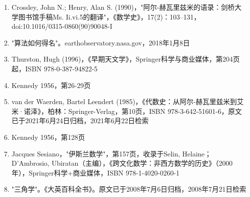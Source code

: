 \begin{enumerate}
\item Crossley, John N.; Henry, Alan S. (1990)，"阿尔-赫瓦里兹米的语录：剑桥大学图书馆手稿Ms. Ii.vi.5的翻译"，《数学史》，17(2)：103–131，doi:10.1016/0315-0860(90)90048-I  
\item "算法如何得名"。earthobservatory.nasa.gov，2018年1月8日  
\item Thurston, Hugh (1996)，《早期天文学》，Springer科学与商业媒体，第204页起，ISBN 978-0-387-94822-5  
\item Kennedy 1956，第26-29页  
\item van der Waerden, Bartel Leendert (1985)，《代数史：从阿尔-赫瓦里兹米到艾米·诺泽》，柏林：Springer-Verlag，第10页，ISBN 978-3-642-51601-6，原文已于2021年6月24日归档，2021年6月22日检索  
\item Kennedy 1956，第128页  
\item Jacques Sesiano，"伊斯兰数学"，第157页，收录于Selin, Helaine；D'Ambrosio, Ubiratan（主编），《跨文化数学：非西方数学的历史》（2000年），Springer科学+商业媒体，ISBN 978-1-4020-0260-1  
\item "三角学"。《大英百科全书》。原文已于2008年7月6日归档，2008年7月21日检索
\end{enumerate}
